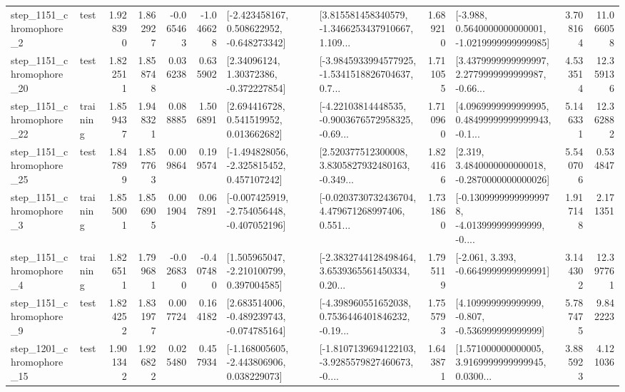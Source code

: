 \begin{tabular}{llrrrrllrlrr}
  step\_1151\_chromophore\_2 &      test &      1.928390 &    1.862927 &     -0.065463 & -1.046628 &   [-2.423458167, 0.508622952, -0.648273342] &  [3.815581458340579, -1.3466253437910667, 1.109... &       1.689210 &  [-3.988, 0.5640000000000001, -1.0219999999999985] &            3.708164 &         11.066058 \\
 step\_1151\_chromophore\_20 &      test &      1.822511 &    1.858748 &      0.036238 &  0.635902 &      [2.34096124, 1.30372386, -0.372227854] &  [-3.9845933994577925, -1.5341518826704637, 0.7... &       1.711055 &  [3.4379999999999997, 2.2779999999999987, -0.66... &            4.533514 &         12.359136 \\
 step\_1151\_chromophore\_22 &  training &      1.859437 &    1.948321 &      0.088885 &  1.506891 &     [2.694416728, 0.541519952, 0.013662682] &  [-4.22103814448535, -0.9003676572958325, -0.69... &       1.710960 &  [4.0969999999999995, 0.48499999999999943, -0.1... &            5.146331 &         12.362882 \\
 step\_1151\_chromophore\_25 &      test &      1.847899 &    1.857763 &      0.009864 &  0.199574 &   [-1.494828056, -2.325815452, 0.457107242] &  [2.520377512300008, 3.8305827932480163, -0.349... &       1.824166 &   [2.319, 3.4840000000000018, -0.2870000000000026] &            5.540706 &          0.534847 \\
  step\_1151\_chromophore\_3 &  training &      1.855001 &    1.856905 &      0.001904 &  0.067891 &  [-0.007425919, -2.754056448, -0.407052196] &  [-0.0203730732436704, 4.479671268997406, 0.551... &       1.731860 &  [-0.13099999999999978, -4.013999999999999, -0.... &            1.917148 &          2.171351 \\
  step\_1151\_chromophore\_4 &  training &      1.826511 &    1.799681 &     -0.026830 & -0.407480 &    [1.505965047, -2.210100799, 0.397004585] &  [-2.3832744128498464, 3.6539365561450334, 0.20... &       1.795119 &               [-2.061, 3.393, -0.6649999999999991] &            3.144302 &         12.397761 \\
  step\_1151\_chromophore\_9 &      test &      1.824252 &    1.831977 &      0.007724 &  0.164182 &   [2.683514006, -0.489239743, -0.074785164] &  [-4.398960551652038, 0.7536446401846232, -0.19... &       1.755793 &    [4.109999999999999, -0.807, -0.536999999999999] &            5.787475 &          9.842223 \\
 step\_1201\_chromophore\_15 &      test &      1.901342 &    1.926822 &      0.025480 &  0.457934 &   [-1.168005605, -2.443806906, 0.038229073] &  [-1.8107139694122103, -3.9285579827460673, -0.... &       1.643871 &  [1.571000000000005, 3.9169999999999945, 0.0300... &            3.885923 &          4.121036 \\

\end{tabular}
